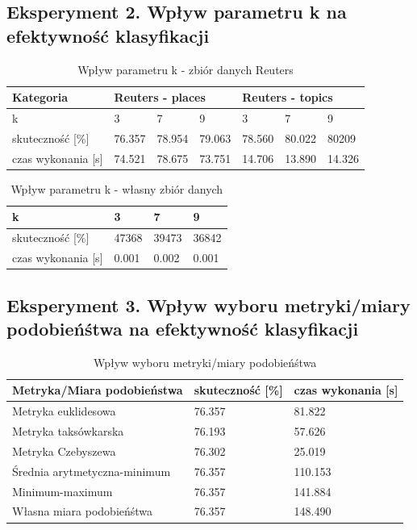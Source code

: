 \documentclass{classrep}
\begin{document}
\subsection{Eksperyment 2. Wpływ parametru k na efektywność klasyfikacji} 
\begin{table}[H]
	\caption{Wpływ parametru k - zbiór danych Reuters}
	\begin{tabular}{l|l|l|l|l|l|l}
		Kategoria& \multicolumn{3}{|l}{ Reuters - places} 	& \multicolumn{3}{|l}{ Reuters - topics}\\
		\hline
		k& 3 & 7 & 9 & 3 & 7 & 9\\
		\hline
		skuteczność [\%]   &76.357&78.954&79.063&78.560&80.022& 80209\\
		czas wykonania [s] &74.521&78.675&73.751&14.706&13.890&14.326\\
	\end{tabular}
\end{table}
\begin{table}[H]
	\centering
	\caption{Wpływ parametru k - własny zbiór danych}
	\begin{tabular}{l|l|l|l}
		k& 3 & 7 & 9 \\
		\hline
		skuteczność [\%]   &47368&39473&36842\\
		czas wykonania [s] &0.001&0.002&0.001\\
	\end{tabular}
\end{table}

\subsection{Eksperyment 3. Wpływ wyboru metryki/miary podobieńśtwa na efektywność klasyfikacji}
\begin{table}[H]
	\centering
	\caption{Wpływ wyboru metryki/miary podobieńśtwa}
	\begin{tabular}{l|l|l}
		Metryka/Miara podobieństwa& skuteczność [\%] & czas wykonania [s]\\
		\hline
		Metryka euklidesowa&76.357&81.822\\
		Metryka taksówkarska&76.193&57.626\\
		Metryka Czebyszewa&76.302&25.019\\
		Średnia arytmetyczna-minimum&76.357&110.153\\
		Minimum-maximum&76.357&141.884\\
		Własna miara podobieńśtwa&76.357&148.490\\
	\end{tabular}
\end{table}
\end{document}
